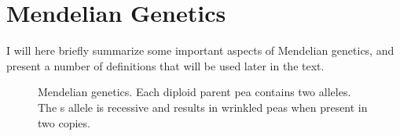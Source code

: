 \documentclass[11pt,a4paper]{book}
\begin{document}
\section{Mendelian Genetics}

I will here briefly summarize some important aspects of Mendelian genetics, and present a number of definitions that will be used later in the text. 
\begin{figure}[!t]
\begin{center}
\caption{\small Mendelian genetics. Each diploid parent pea contains two alleles. The s allele is recessive and results in wrinkled peas when present in two copies.}
\label{alleles}
\end{center}
\end{figure}
\end{document}
